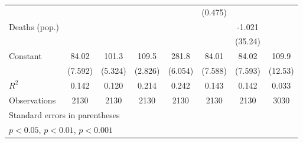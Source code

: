 \documentclass{article}
\begin{document}
{\begin{longtable}{l*{7}{c}}
                &                  &                  &                  &                  &  (0.475)         &                  &                  \\
Deaths (pop.)   &                  &                  &                  &                  &                  &   -1.021         &                  \\
                &                  &                  &                  &                  &                  &  (35.24)         &                  \\
Constant        &    84.02\sym{***}&    101.3\sym{***}&    109.5\sym{***}&    281.8\sym{***}&    84.01\sym{***}&    84.02\sym{***}&    109.9\sym{***}\\
                &  (7.592)         &  (5.324)         &  (2.826)         &  (6.054)         &  (7.588)         &  (7.593)         &  (12.53)         \\
\hline
\(R^{2}\)       &    0.142         &    0.120         &    0.214         &    0.242         &    0.143         &    0.142         &    0.033         \\
Observations    &     2130         &     2130         &     2130         &     2130         &     2130         &     2130         &     3030         \\
\hline\hline
\multicolumn{8}{l}{\footnotesize Standard errors in parentheses}\\
\multicolumn{8}{l}{\footnotesize \sym{*} \(p<0.05\), \sym{**} \(p<0.01\), \sym{***} \(p<0.001\)}\\
\end{longtable}
}
\end{document}
